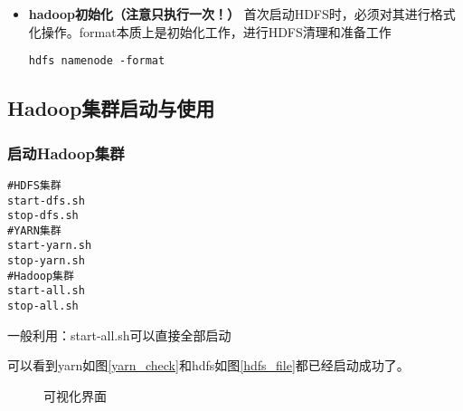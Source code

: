 \documentclass[bachelor]{thesis-uestc}
\begin{document}
\begin{itemize}
\item \textbf{hadoop初始化（注意只执行一次！）}
首次启动HDFS时，必须对其进行格式化操作。format本质上是初始化工作，进行HDFS清理和准备工作
\begin{verbatim}
hdfs namenode -format
\end{verbatim}
\end{itemize}


\subsection{Hadoop集群启动与使用}

\subsubsection{启动Hadoop集群}
\begin{verbatim}
#HDFS集群
start-dfs.sh
stop-dfs.sh
#YARN集群
start-yarn.sh
stop-yarn.sh
#Hadoop集群
start-all.sh
stop-all.sh 
\end{verbatim}
一般利用：start-all.sh可以直接全部启动

可以看到yarn如图\ref{yarn_check}和hdfs如图\ref{hdfs_file}都已经启动成功了。
\begin{figure}[htbp]
\caption{可视化界面}
\label{check}
\end{figure}
\end{document}
